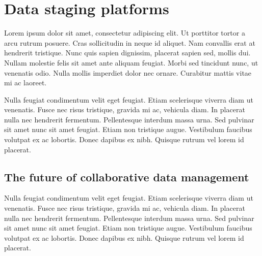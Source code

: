 
\section{Data staging platforms} %
\label{sec:data_staging_platforms}

Lorem ipsum dolor sit amet, consectetur adipiscing elit. Ut porttitor tortor a arcu rutrum posuere. Cras sollicitudin in neque id aliquet. Nam convallis erat at hendrerit tristique. Nunc quis sapien dignissim, placerat sapien sed, mollis dui. Nullam molestie felis sit amet ante aliquam feugiat. Morbi sed tincidunt nunc, ut venenatis odio. Nulla mollis imperdiet dolor nec ornare. Curabitur mattis vitae mi ac laoreet.

Nulla feugiat condimentum velit eget feugiat. Etiam scelerisque viverra diam ut venenatis. Fusce nec risus tristique, gravida mi ac, vehicula diam. In placerat nulla nec hendrerit fermentum. Pellentesque interdum massa urna. Sed pulvinar sit amet nunc sit amet feugiat. Etiam non tristique augue. Vestibulum faucibus volutpat ex ac lobortis. Donec dapibus ex nibh. Quisque rutrum vel lorem id placerat.

\subsection{The future of collaborative data management} %
\label{sub:the_future_of_collaborative_data_management}

Nulla feugiat condimentum velit eget feugiat. Etiam scelerisque viverra diam ut venenatis. Fusce nec risus tristique, gravida mi ac, vehicula diam. In placerat nulla nec hendrerit fermentum. Pellentesque interdum massa urna. Sed pulvinar sit amet nunc sit amet feugiat. Etiam non tristique augue. Vestibulum faucibus volutpat ex ac lobortis. Donec dapibus ex nibh. Quisque rutrum vel lorem id placerat.


